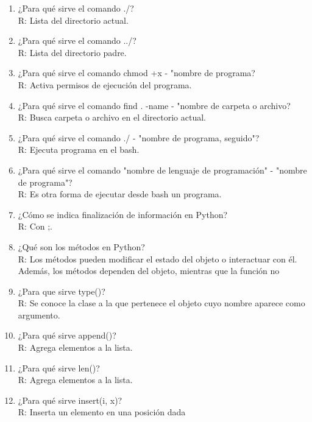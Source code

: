\documentclass[etterpaper, 12pt, oneside]{article}%
\begin{document}
\begin{enumerate}
		\item ¿Para qué sirve el comando ./?
		\\R: Lista del directorio actual.
		
		\item ¿Para qué sirve el comando ../?
		\\R: Lista del directorio padre.
		
		\item ¿Para qué sirve el comando chmod +x - "nombre de programa?
		\\R: Activa permisos de ejecución del programa.
		
		\item ¿Para qué sirve el comando find . -name - "nombre de carpeta o archivo?
		\\R: Busca carpeta o archivo en el directorio actual.
		
		\item ¿Para qué sirve el comando ./ - "nombre de programa, seguido"?
		\\R: Ejecuta programa en el bash.
		
		\item ¿Para qué sirve el comando "nombre de lenguaje de programación" - "nombre de programa"?
		\\R: Es otra forma de ejecutar desde bash un programa.
		
		\item ¿Cómo se indica finalización de información en Python?
		\\R: Con ;.
		
		\item ¿Qué son los métodos en Python?
		\\R: Los métodos pueden modificar el estado del objeto o interactuar con él. Además, los métodos dependen del objeto, mientras que la función no
		
		\item ¿Para que sirve type()?
		\\R: Se conoce la clase a la que pertenece el objeto cuyo nombre aparece como argumento.
		
		\item ¿Para qué sirve append()?
		\\R: Agrega elementos a la lista.
		
		\item ¿Para qué sirve len()?
		\\R: Agrega elementos a la lista.
		
		
		\item ¿Para qué sirve insert(i, x)?
		\\R: Inserta un elemento en una posición dada
		

\end{enumerate}
\end{document}
